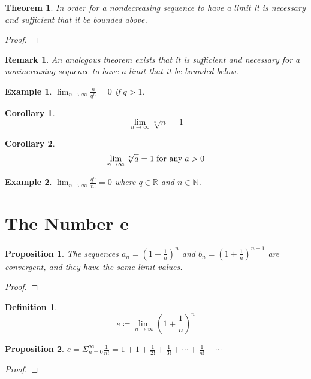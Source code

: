 \documentclass[onecolumn]{ctexart}
\newtheorem{definition}{Definition}
\newtheorem{theorem}{Theorem}
\newtheorem{proposition}{Proposition}
\newtheorem{corollary}{Corollary}
\newtheorem{remark}{Remark}
\newtheorem{example}{Example}
\begin{document}
\begin{theorem}
  In order for a nondecreasing sequence to have a limit it is necessary and 
  sufficient that it be bounded above.
\end{theorem}
\begin{proof}
  
\end{proof}
\begin{remark}
  An analogous theorem exists that it is sufficient and necessary for a 
  nonincreasing sequence to have a limit that it be bounded below.
\end{remark}

\begin{example}
  $\lim_{n \to \infty} \frac{n}{q^n} = 0$ if $q > 1$.
\end{example}

\begin{corollary}
  \[
    \lim_{n \to \infty} \sqrt[n]{n} = 1
  \]
\end{corollary}

\begin{corollary}
  \[
    \lim_{n \to \infty} \sqrt[n]{a} = 1 \thickspace \textnormal{for any} \thickspace a > 0
  \]
\end{corollary}

\begin{example}
  $\lim_{n \to \infty} \frac{q^n}{n!} = 0$ where $q \in \mathbb{R}$ and $n \in \mathbb{N}$.
\end{example}

\section{The Number e}

\begin{proposition}
  The sequences $a_n = (1 + \frac{1}{n})^n$ and $b_n = (1 + \frac{1}{n})^{n+1}$ 
  are convergent, and they have the same limit values.
\end{proposition}
\begin{proof}
  
\end{proof}

\begin{definition}
  \[
    e \coloneqq \lim_{n \to \infty} (1 + \frac{1}{n})^n
  \]
\end{definition}

\begin{proposition}
  $e = \Sigma_{n=0}^{\infty} \frac{1}{n!} = 1 + 1 + \frac{1}{2!} + \frac{1}{3!} + \cdots + \frac{1}{n!} + \cdots$
\end{proposition}
\begin{proof}
  
\end{proof}
\end{document}
